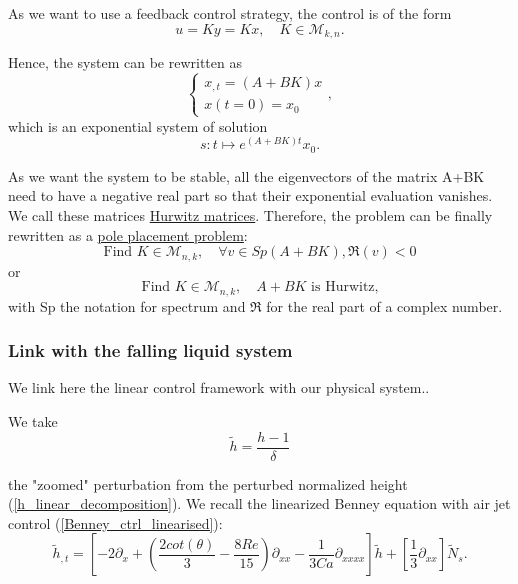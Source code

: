 \documentclass[12pt]{article}
\begin{document}
As we want to use a feedback control strategy, the control is of the form 
\begin{equation}
    u = Ky = Kx, \quad K \in \mathcal{M}_{k,n}.
\end{equation}

Hence, the system can be rewritten as 
\begin{equation}\label{expo_ctrl_system}
    \left\{
    \begin{aligned}
        x_{,t}=(A+BK)x \\
        x(t=0) = x_0
    \end{aligned}
    \right.,
\end{equation}
which is an exponential system of solution $$s:t\mapsto  e^{(A+BK)t}x_0.$$

As we want the system to be stable, all the eigenvectors of the matrix A+BK need to have a 
negative real part so that their exponential evaluation vanishes. We call these matrices \underline{Hurwitz matrices}. 
Therefore, the problem can be finally rewritten as a \underline{pole placement problem}: 
\begin{equation}\label{eq_pole_placement}
\boxed{
    \text{Find } K \in \mathcal{M}_{n,k},\quad \forall v \in Sp(A+BK), \mathfrak{R}(v) <0
    }
\end{equation}
or 
\begin{equation}\label{eq_pole_placement_Hurwitz}
    \text{Find } K \in \mathcal{M}_{n,k},\quad A+BK \text{ is Hurwitz,}
\end{equation}
with Sp the notation for spectrum and $\mathfrak{R}$ for the real part of a complex number.
\subsubsection{Link with the falling liquid system}\label{sub_section_link_ctr_FLF}
We link here the linear control framework with our physical system.. 

We take 
\begin{equation}
\tilde{h} = \frac{h-1}{\delta}
\end{equation}

the "zoomed" perturbation from the perturbed normalized height (\ref{h_linear_decomposition}). We recall the linearized Benney equation with air jet control (\ref{Benney_ctrl_linearised}):
$$\tilde{h}_{,t} = \left[ -2\partial_x + (\frac{2cot(\theta)}{3}-\frac{8Re}{15})\partial_{xx} - \frac{1}{3Ca}\partial_{xxxx}\right]\tilde{h} + \left[ \frac{1}{3}\partial_{xx}\right]\tilde{N}_s.$$
\\
\end{document}
